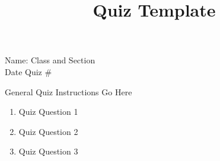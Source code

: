 \documentclass{article}
\begin{document}
\title{Quiz Template}
\noindent Name: %
\hfill Class and Section\\
Date \hfill Quiz \#\\
\bigskip

General Quiz Instructions Go Here\\
\lipsum[1]
\begin{enumerate}[\bf(1)]
\item Quiz Question 1
\vspace{50mm}
\item Quiz Question 2
\vspace{50mm}
\item Quiz Question 3
\vspace{50mm}
\end{enumerate}
\end{document}
